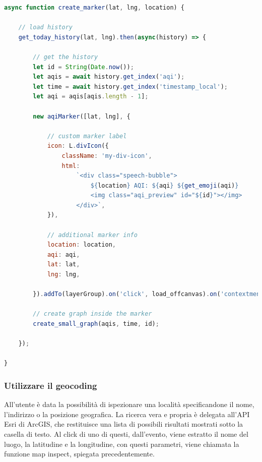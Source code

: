 \begin{lstlisting}[language=Javascript,caption={La funzione create marker.},label={lst:createMarker}]
async function create_marker(lat, lng, location) {
    
    // load history
    get_today_history(lat, lng).then(async(history) => {

        // get the history
        let id = String(Date.now());
        let aqis = await history.get_index('aqi');
        let time = await history.get_index('timestamp_local');
        let aqi = aqis[aqis.length - 1];

        new aqiMarker([lat, lng], {

            // custom marker label
            icon: L.divIcon({
                className: 'my-div-icon',
                html:
                    `<div class="speech-bubble">
                        ${location} AQI: ${aqi} ${get_emoji(aqi)}
                        <img class="aqi_preview" id="${id}"></img>
                    </div>`,
            }),
    
            // additional marker info
            location: location,
            aqi: aqi,
            lat: lat,
            lng: lng,
    
        }).addTo(layerGroup).on('click', load_offcanvas).on('contextmenu', function(e) { map.removeLayer(this); });
    
        // create graph inside the marker
        create_small_graph(aqis, time, id);

    });
    
}
\end{lstlisting}

\subsubsection{Utilizzare il geocoding}
All'utente è data la possibilità di ispezionare una località specificandone il nome, l'indirizzo o la posizione geografica.
La ricerca vera e propria è delegata all'API Esri di ArcGIS, che restituisce una lista di possibili risultati mostrati sotto la casella di testo.
Al click di uno di questi, dall'evento, viene estratto il nome del luogo, la latitudine e la longitudine, con questi parametri, viene chiamata la funzione map inspect, spiegata precedentemente.



